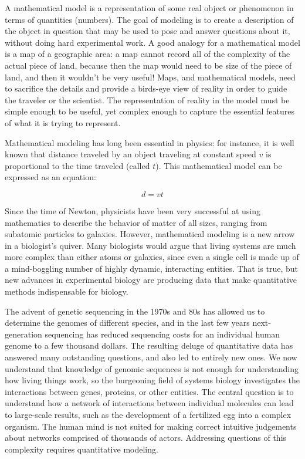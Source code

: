\documentclass[
  letterpaper,
  DIV=11,
  numbers=noendperiod]{scrreprt}
\begin{document}

A mathematical model is a representation of some real object or
phenomenon in terms of quantities (numbers). The goal of modeling is to
create a description of the object in question that may be used to pose
and answer questions about it, without doing hard experimental work. A
good analogy for a mathematical model is a map of a geographic area: a
map cannot record all of the complexity of the actual piece of land,
because then the map would need to be size of the piece of land, and
then it wouldn't be very useful! Maps, and mathematical models, need to
sacrifice the details and provide a birds-eye view of reality in order
to guide the traveler or the scientist. The representation of reality in
the model must be simple enough to be useful, yet complex enough to
capture the essential features of what it is trying to represent.

Mathematical modeling has long been essential in physics: for instance,
it is well known that distance traveled by an object traveling at
constant speed \(v\) is proportional to the time traveled (called
\(t\)). This mathematical model can be expressed as an equation:

\[d = vt\]

Since the time of Newton, physicists have been very successful at using
mathematics to describe the behavior of matter of all sizes, ranging
from subatomic particles to galaxies. However, mathematical modeling is
a new arrow in a biologist's quiver. Many biologists would argue that
living systems are much more complex than either atoms or galaxies,
since even a single cell is made up of a mind-boggling number of highly
dynamic, interacting entities. That is true, but new advances in
experimental biology are producing data that make quantitative methods
indispensable for biology.

The advent of  genetic sequencing in the 1970s
and 80s has allowed us to determine the genomes of different species,
and in the last few years 
next-generation sequencing has reduced sequencing costs for an
individual human genome to a few thousand dollars. The resulting deluge
of quantitative data has answered many outstanding questions, and also
led to entirely new ones. We now understand that knowledge of genomic
sequences is not enough for understanding how living things work, so the
burgeoning field of  systems biology investigates
the interactions between genes, proteins, or other entities. The central
question is to understand how a network of interactions between
individual molecules can lead to large-scale results, such as the
development of a fertilized egg into a complex organism. The human mind
is not suited for making correct intuitive judgements about networks
comprised of thousands of actors. Addressing questions of this
complexity requires quantitative modeling.
\end{document}
